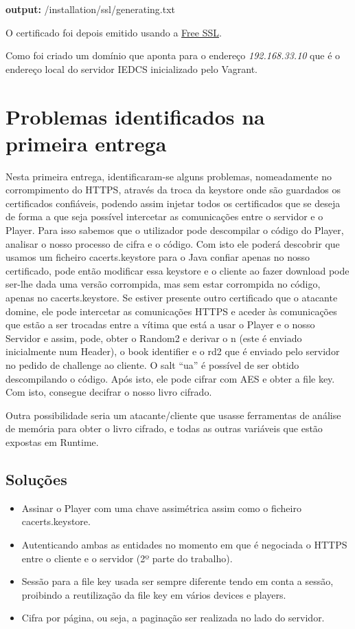\documentclass[pdftex,12pt,a4paper]{report}
\begin{document}
\textbf{output:} /installation/ssl/generating.txt

O certificado foi depois emitido usando a \href{https://www.instantssl.com/free-ssl-certificate.html}{Free SSL}.

Como foi criado um domínio que aponta para o endereço \textit{192.168.33.10} que é o endereço local do servidor IEDCS inicializado pelo Vagrant.

\section{Problemas identificados na primeira entrega}

Nesta primeira entrega, identificaram-se alguns problemas, nomeadamente no corrompimento do HTTPS, através da troca da keystore onde são guardados os certificados confiáveis, podendo assim injetar todos os certificados que se deseja de forma a que seja possível intercetar as comunicações entre o servidor e o Player. Para isso sabemos que o utilizador pode descompilar o código do Player, analisar o nosso processo de cifra e o código. Com isto ele poderá descobrir que usamos um ficheiro cacerts.keystore para o Java confiar apenas no nosso certificado, pode então modificar essa keystore e o cliente ao fazer download pode ser-lhe dada uma versão corrompida, mas sem estar corrompida no código, apenas no cacerts.keystore. Se estiver presente outro certificado que o atacante domine, ele pode intercetar as comunicações HTTPS e aceder às comunicações que estão a ser trocadas entre a vítima que está a usar o Player e o nosso Servidor e assim, pode, obter o Random2 e derivar o n (este é enviado inicialmente num Header), o book identifier e o rd2 que é enviado pelo servidor no pedido de challenge ao cliente. O salt “ua” é possível de ser obtido descompilando o código. Após isto, ele pode cifrar com AES e obter a file key. Com isto, consegue decifrar o nosso livro cifrado.

Outra possibilidade seria um atacante/cliente que usasse ferramentas de análise de memória para obter o livro cifrado, e todas as outras variáveis que estão expostas em Runtime.

\subsection{Soluções}

\begin{itemize}
\item Assinar o Player com uma chave assimétrica assim como o ficheiro cacerts.keystore.
\item Autenticando ambas as entidades no momento em que é negociada o HTTPS entre o cliente e o servidor (2º parte do trabalho).
\item Sessão para a file key usada ser sempre diferente tendo em conta a sessão, proibindo a reutilização da file key em vários devices e players.
\item Cifra por página, ou seja, a paginação ser realizada no lado do servidor.
\end{itemize}
\end{document}
